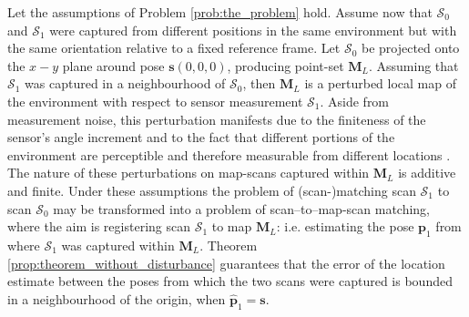 Let the assumptions of Problem \ref{prob:the_problem} hold. Assume now
that $\mathcal{S}_0$ and $\mathcal{S}_1$ were captured from different
positions in the same environment but with the same orientation
relative to a fixed reference frame. Let $\mathcal{S}_0$ be projected onto
the $x-y$ plane around pose $\bm{s}(0,0,0)$,
producing point-set $\bm{M}_L$. Assuming that $\mathcal{S}_1$ was captured in a
neighbourhood of $\mathcal{S}_0$, then $\bm{M}_L$ is a perturbed local map of
the environment with respect to sensor measurement $\mathcal{S}_1$. Aside from
measurement noise, this perturbation manifests due to the finiteness of the
sensor's angle increment and to the fact that different portions of the
environment are perceptible and therefore measurable from different locations
\cite{olson}. The nature of these perturbations on map-scans captured within
$\bm{M}_L$ is additive and finite. Under these assumptions the problem of
(scan-)matching scan $\mathcal{S}_1$ to scan $\mathcal{S}_0$ may be transformed
into a problem of scan--to--map-scan matching, where the aim is registering
scan $\mathcal{S}_1$ to map $\bm{M}_L$: i.e. estimating the pose $\bm{p}_1$
from where $\mathcal{S}_1$ was captured within $\bm{M}_L$. Theorem
\ref{prop:theorem_without_disturbance} \cite{icte} guarantees that the error of
the location estimate between the poses from which the two scans were captured
is bounded in a neighbourhood of the origin, when $\hat{\bm{p}}_1 = \bm{s}$.


